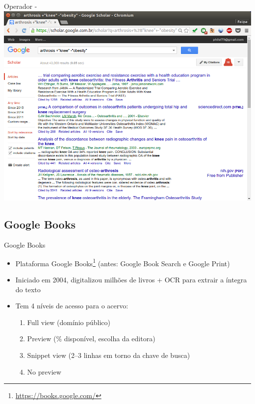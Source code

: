 \documentclass{beamer}
\begin{document}
\begin{frame}{Operador -}
  \includegraphics[height=.85\textheight]{Busca/google-fu-plusminus}
\end{frame}

\subsection{Google Books}

\begin{frame}{Google Books}
  \begin{itemize}
  \item Plataforma \alert{Google
      Books}\footnote{\url{https://books.google.com/}} (antes: Google
    Book Search e Google Print)
  \item Iniciado em 2004, digitalizou milhões de livros + OCR para
    extrair a íntegra do texto
  \item Tem 4 níveis de acesso para o acervo:
    \begin{enumerate}
    \item Full view (domínio público)
    \item Preview (\% disponível, escolha da editora)
    \item Snippet view (2--3 linhas em torno da chave de busca)
    \item No preview
    \end{enumerate}
  \end{itemize}
\end{frame}
\end{document}
